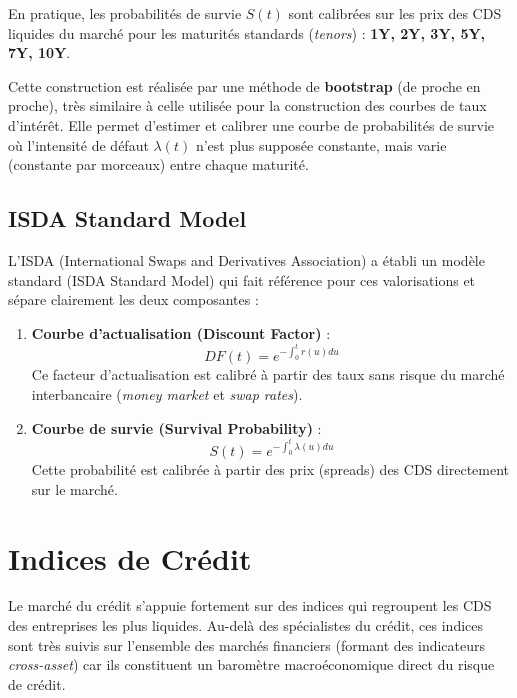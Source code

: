 En pratique, les probabilités de survie $S(t)$ sont calibrées sur les prix des CDS liquides du marché pour les maturités standards (\textit{tenors}) : \textbf{1Y, 2Y, 3Y, 5Y, 7Y, 10Y}.

Cette construction est réalisée par une méthode de \textbf{bootstrap} (de proche en proche), très similaire à celle utilisée pour la construction des courbes de taux d'intérêt. Elle permet d'estimer et calibrer une courbe de probabilités de survie où l'intensité de défaut $\lambda(t)$ n'est plus supposée constante, mais varie (constante par morceaux) entre chaque maturité.

\subsection{ISDA Standard Model}

L'ISDA (International Swaps and Derivatives Association) a établi un modèle standard (ISDA Standard Model) qui fait référence pour ces valorisations et sépare clairement les deux composantes :

\begin{enumerate}
    \item \textbf{Courbe d'actualisation (Discount Factor)} :
    \begin{equation}
        DF(t) = e^{-\int_0^t r(u) du}
    \end{equation}
    Ce facteur d'actualisation est calibré à partir des taux sans risque du marché interbancaire (\textit{money market} et \textit{swap rates}).
    
    \item \textbf{Courbe de survie (Survival Probability)} :
    \begin{equation}
        S(t) = e^{-\int_0^t \lambda(u) du}
    \end{equation}
    Cette probabilité est calibrée à partir des prix (spreads) des CDS directement sur le marché.
\end{enumerate}

\section{Indices de Crédit}

Le marché du crédit s'appuie fortement sur des indices qui regroupent les CDS des entreprises les plus liquides. Au-delà des spécialistes du crédit, ces indices sont très suivis sur l'ensemble des marchés financiers (formant des indicateurs \textit{cross-asset}) car ils constituent un baromètre macroéconomique direct du risque de crédit. 

